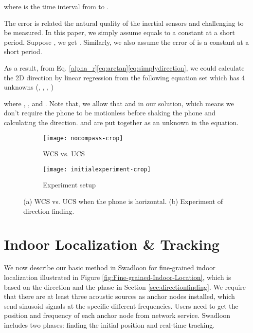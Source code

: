 \documentclass[]{sig-alternate-10pt}
\def \ourprotocol{Swadloon\xspace}
\begin{document}
where  is the time interval from  to .

The error  is related the natural quality of the inertial
sensors and challenging to be measured. In this paper, we simply
assume  equals to a constant  at a short period.
Suppose , we get
. Similarly, we also assume
the error of  is a constant  at a short period.

As a result, from
Eq. \eqref{alpha_r}\eqref{eq:arctan}\eqref{eq:simplydirection}, we
could calculate the 2D direction by linear regression from the following
equation set which has 4 unknowns (, ,
, )

where ,
,
 and
. Note that, we allow that
 and  in our solution, which means we
don't require the phone to be motionless before shaking the phone and
calculating the direction.  and  are put together as an unknown
 in the equation.


\begin{figure}[h]
\begin{center}
\begin{subfigure}[b]{0.18\textwidth}
\texttt{[image: nocompass-crop]}
        \caption{WCS vs. UCS}
\end{subfigure}
\begin{subfigure}[b]{0.23\textwidth}
\texttt{[image: initialexperiment-crop]}
        \caption{Experiment setup}
\end{subfigure}

    \caption{(a) WCS vs. UCS when the phone is horizontal. (b) Experiment of direction finding.}
    \label{fig:duallayout}
\end{center}
\end{figure}

\section{Indoor Localization \& Tracking}
\label{sec:localization}

We now describe our basic
 method in \ourprotocol for  fine-grained indoor localization
 illustrated in Figure \ref{fig:Fine-grained-Indoor-Location}, which is based on the direction  and the phase  in Section \ref{sec:directionfinding}.
We require that there are at least three acoustic sources as
 anchor nodes installed, which send sinusoid signals at
 the specific different  frequencies.
Users need to get the position and frequency of
 each anchor node from network service.
\ourprotocol includes two phases:
 finding the initial position and real-time tracking.
\end{document}
